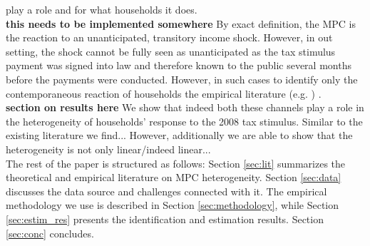 play a role and for what households it does. \\ 

\textbf{this needs to be implemented somewhere}
By exact definition, the MPC is the reaction to an unanticipated, transitory income shock. However, in out setting, the shock cannot be fully seen as unanticipated as the tax stimulus payment was signed into law and therefore known to the public several months before the payments were conducted. However, in such cases to identify only the contemporaneous reaction of households the empirical literature (e.g. \cite{parker_etal_13}) .  \\ 

\textbf{section on results here}
We show that indeed both these channels play a role in the heterogeneity of households' response to the 2008 tax stimulus. Similar to the existing literature we find... However, additionally we are able to show that the heterogeneity is not only linear/indeed linear... \\ 
The rest of the paper is structured as follows: Section \ref{sec:lit} summarizes the theoretical and empirical literature on MPC heterogeneity. Section \ref{sec:data} discusses the data source and challenges connected with it. The empirical methodology we use is described in Section \ref{sec:methodology}, while Section \ref{sec:estim_res} presents the identification and estimation results. Section \ref{sec:conc} concludes.